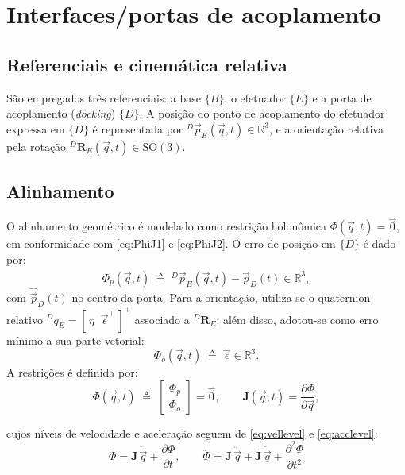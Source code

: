 \section{Interfaces/portas de acoplamento}

\subsection{Referenciais e cinemática relativa}
São empregados três referenciais:
a base $\{B\}$, o efetuador $\{E\}$ e a porta de acoplamento (\emph{docking}) $\{D\}$. 
A posição do ponto de acoplamento do efetuador expressa em
$\{D\}$ é representada por
${}^{D}\!\vec p_{E}(\vec q,t)\in\mathbb R^{3}$,
e a orientação relativa pela rotação
${}^{D}\!\mathbf R_{E}(\vec q,t)\in\mathrm{SO}(3)$.

\subsection{Alinhamento}
O alinhamento geométrico é modelado como restrição holonômica
$\Phi(\vec q,t)=\vec 0$,
em conformidade com \eqref{eq:PhiJ1} e \eqref{eq:PhiJ2}. 
O erro de posição em $\{D\}$ é dado por:
\begin{equation}
\Phi_{p}(\vec q,t)\;
\triangleq\;
{}^{D}\!\vec p_{E}(\vec q,t)-\hat{\vec p}_{D}(t)\in\mathbb R^{3},
\label{eq:phi_pos}
\end{equation}
com $\hat{\vec p}_{D}(t)$ no centro da porta. 
Para a orientação, utiliza-se o quaternion relativo
${}^{D}\!q_{E}=[\,\eta\;\;\vec\epsilon^{\top}\,]^{\top}$
associado a ${}^{D}\!\mathbf R_{E}$;
além disso, adotou-se como erro mínimo a sua parte vetorial:
\begin{equation}
\Phi_{o}(\vec q,t)\;\triangleq\;\vec\epsilon\in\mathbb R^{3}.
\label{eq:phi_ori}
\end{equation}
A restrições é definida por:
\begin{equation}
\Phi(\vec q,t)\;\triangleq\;\begin{bmatrix}\Phi_{p}\\ \Phi_{o}\end{bmatrix}=\vec 0,
\qquad 
\mathbf J(\vec q,t)=\frac{\partial \Phi}{\partial \vec q},
\label{eq:phi_stack_dock}
\end{equation}

cujos níveis de velocidade e aceleração seguem de
\eqref{eq:vellevel} e \eqref{eq:acclevel}:
\begin{equation}
    \label{eq:vel_acel_porta_docking}
\dot\Phi
=
\mathbf J\,\dot{\vec q}
+\frac{\partial \Phi}{\partial t},
\qquad
\ddot\Phi
=
\mathbf J\,\ddot{\vec q}
+\dot{\mathbf J}\,\dot{\vec q}
+\frac{\partial^{2}\Phi}{\partial t^{2}}
\end{equation}

